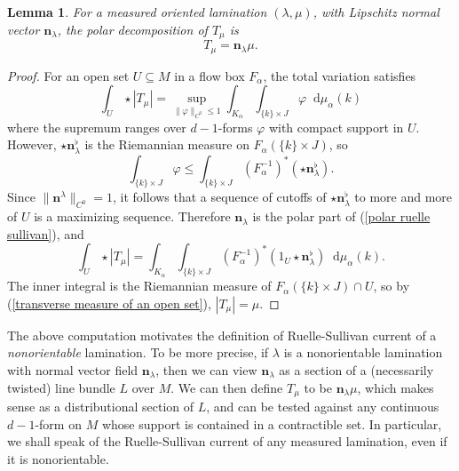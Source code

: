\documentclass[reqno,11pt]{amsart}
\newcommand*\dif{\mathop{}\!\mathrm{d}}
\newcommand{\normal}{\mathbf n}
\newtheorem{lemma}[theorem]{Lemma}
\theoremstyle{definition}
\numberwithin{equation}{section}
\begin{document}
\begin{lemma}
For a measured oriented lamination $(\lambda, \mu)$, with Lipschitz normal vector $\normal_\lambda$, the polar decomposition of $T_\mu$ is
\begin{equation}\label{polar ruelle sullivan}
T_\mu = \normal_\lambda \mu.
\end{equation}
\end{lemma}
\begin{proof}
For an open set $U \subseteq M$ in a flow box $F_\alpha$, the total variation satisfies
$$\int_U \star |T_\mu| = \sup_{\|\varphi\|_{C^0} \leq 1} \int_{K_\alpha} \int_{\{k\} \times J} \varphi \dif \mu_\alpha(k)$$
where the supremum ranges over $d-1$-forms $\varphi$ with compact support in $U$.
However, $\star \normal_\lambda^\flat$ is the Riemannian measure on $F_\alpha(\{k\} \times J)$, so
$$\int_{\{k\} \times J} \varphi \leq \int_{\{k\} \times J} (F_\alpha^{-1})^*(\star \normal_\lambda^\flat).$$
Since $\|\normal^\lambda\|_{C^0} = 1$, it follows that a sequence of cutoffs of $\star \normal_\lambda^\flat$ to more and more of $U$ is a maximizing sequence.
Therefore $\normal_\lambda$ is the polar part of (\ref{polar ruelle sullivan}), and
$$\int_U \star |T_\mu| = \int_{K_\alpha} \int_{\{k\} \times J} (F_\alpha^{-1})^*(1_U \star \normal_\lambda^\flat) \dif \mu_\alpha(k).$$
The inner integral is the Riemannian measure of $F_\alpha(\{k\} \times J) \cap U$, so by (\ref{transverse measure of an open set}), $|T_\mu| = \mu$.
\end{proof}

The above computation motivates the definition of Ruelle-Sullivan current of a \emph{nonorientable} lamination.
To be more precise, if $\lambda$ is a nonorientable lamination with normal vector field $\normal_\lambda$, then we can view $\normal_\lambda$ as a section of a (necessarily twisted) line bundle $L$ over $M$.
We can then define $T_\mu$ to be $\normal_\lambda \mu$, which makes sense as a distributional section of $L$, and can be tested against any continuous $d-1$-form on $M$ whose support is contained in a contractible set.
In particular, we shall speak of the Ruelle-Sullivan current of any measured lamination, even if it is nonorientable.
\end{document}
